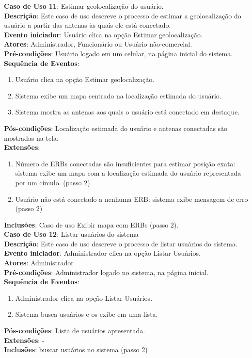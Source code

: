 \documentclass[]{politex}
\begin{document}
\noindent \textbf{Caso de Uso 11}: Estimar geolocalização do usuário. \\
\textbf{Descrição}: Este caso de uso descreve o processo de estimar a 
geolocalização do usuário a partir das antenas às quais ele está conectado. \\
\textbf{Evento iniciador}: Usuário clica na opção Estimar geolocalização. \\
\textbf{Atores}: Administrador, Funcionário ou Usuário não-comercial. \\
\textbf{Pré-condições}: Usuário logado em um celular, na página inicial do 
sistema. \\
\textbf{Sequência de Eventos}:
\begin{enumerate}
\item Usuário clica na opção Estimar geolocalização.
\item Sistema exibe um mapa centrado na localização estimada do usuário.
\item Sistema mostra as antenas aos quais o usuário está conectado em destaque.
\end{enumerate}
\textbf{Pós-condições}: Localização estimada do usuário e antenas conectadas são
mostradas na tela. \\
\textbf{Extensões}:
\begin{enumerate}
\item Número de ERBs conectadas são insuficientes para estimar posição exata: 
sistema exibe um mapa com a localização estimada do usuário representada por um
círculo. (passo 2)
\item Usuário não está conectado a nenhuma ERB: sistema exibe mensagem de erro
(passo 2)
\end{enumerate}
\textbf{Inclusões}: Caso de uso Exibir mapa com ERBs (passo 2). \\

\noindent \textbf{Caso de Uso 12}: Listar usuários do sistema \\
\textbf{Descrição}: Este caso de uso descreve o processo de listar usuários do 
sistema. \\
\textbf{Evento iniciador}: Administrador clica na opção Listar Usuários. \\
\textbf{Atores}: Administrador \\
\textbf{Pré-condições}: Administrador logado no sistema, na página inicial. \\
\textbf{Sequência de Eventos}:
\begin{enumerate}
\item Administrador clica na opção Listar Usuários.
\item Sistema busca usuários e os exibe em uma lista.
\end{enumerate}
\textbf{Pós-condições}: Lista de usuários apresentada. \\
\textbf{Extensões}: - \\
\textbf{Inclusões}: buscar usuários no sistema (passo 2) \\
\end{document}
